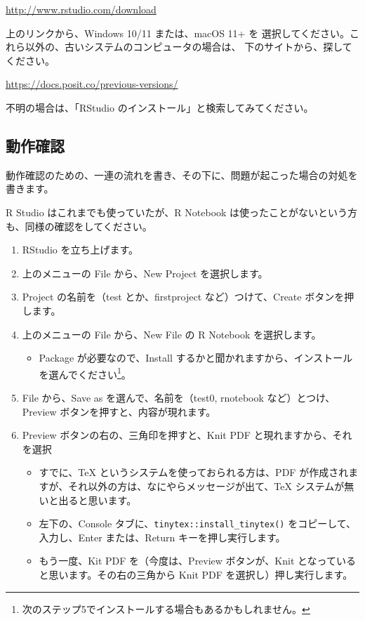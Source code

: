 \documentclass[
  xelatex, ja=standard]{bxjsbook}
\providecommand{\tightlist}{%
  \setlength{\itemsep}{0pt}\setlength{\parskip}{0pt}}
\theoremstyle{definition}
\theoremstyle{definition}
\theoremstyle{definition}
\theoremstyle{definition}
\theoremstyle{remark}
\begin{document}
\url{http://www.rstudio.com/download}

上のリンクから、Windows 10/11 または、macOS 11+ を 選択してください。これら以外の、古いシステムのコンピュータの場合は、 下のサイトから、探してください。

\url{https://docs.posit.co/previous-versions/}

不明の場合は、「RStudio のインストール」と検索してみてください。

\hypertarget{ux52d5ux4f5cux78baux8a8d}{%
\subsection{動作確認}\label{ux52d5ux4f5cux78baux8a8d}}

動作確認のための、一連の流れを書き、その下に、問題が起こった場合の対処を書きます。

R Studio はこれまでも使っていたが、R Notebook は使ったことがないという方も、同様の確認をしてください。

\begin{enumerate}
\def\labelenumi{\arabic{enumi}.}
\tightlist
\item
  RStudio を立ち上げます。
\item
  上のメニューの File から、New Project を選択します。
\item
  Project の名前を（test とか、firstproject など）つけて、Create ボタンを押します。
\item
  上のメニューの File から、New File の R Notebook を選択します。

  \begin{itemize}
  \tightlist
  \item
    Package が必要なので、Install するかと聞かれますから、インストールを選んでください\footnote{次のステップ5でインストールする場合もあるかもしれません。}。
  \end{itemize}
\item
  File から、Save as を選んで、名前を（test0, rnotebook など）とつけ、Preview ボタンを押すと、内容が現れます。
\item
  Preview ボタンの右の、三角印を押すと、Knit PDF と現れますから、それを選択

  \begin{itemize}
  \tightlist
  \item
    すでに、TeX というシステムを使っておられる方は、PDF が作成されますが、それ以外の方は、なにやらメッセージが出て、TeX システムが無いと出ると思います。
  \item
    左下の、Console タブに、\texttt{tinytex::install\_tinytex()} をコピーして、入力し、Enter または、Return キーを押し実行します。
  \item
    もう一度、Kit PDF を（今度は、Preview ボタンが、Knit となっていると思います。その右の三角から Knit PDF を選択し）押し実行します。
  \end{itemize}
\end{enumerate}
\end{document}
